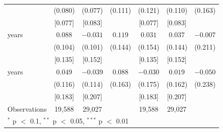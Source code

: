 \begin{tabular}{lcccccc}
 & (0.080) & (0.077) & (0.111) & (0.121) & (0.110) & (0.163) \\
 & [0.077] & [0.083] &  & [0.077] & [0.083] &  \\
\quad 2 years & $0.088$ & $-0.031$ & $0.119$ & $0.031$ & $0.037$ & $-0.007$ \\
 & (0.104) & (0.101) & (0.144) & (0.154) & (0.144) & (0.211) \\
 & [0.135] & [0.152] &  & [0.135] & [0.152] &  \\
\quad 3 years & $0.049$ & $-0.039$ & $0.088$ & $-0.030$ & $0.019$ & $-0.050$ \\
 & (0.116) & (0.114) & (0.163) & (0.175) & (0.162) & (0.238) \\
 & [0.183] & [0.207] &  & [0.183] & [0.207] &  \\
\midrule
Observations & 19,588 & 29,027 &  & 19,588 & 29,027 &  \\
\bottomrule
\multicolumn{7}{l}{\footnotesize $^{*}$ p $<$ 0.1, $^{**}$ p $<$ 0.05, $^{***}$ p $<$ 0.01} \\
\end{tabular}
